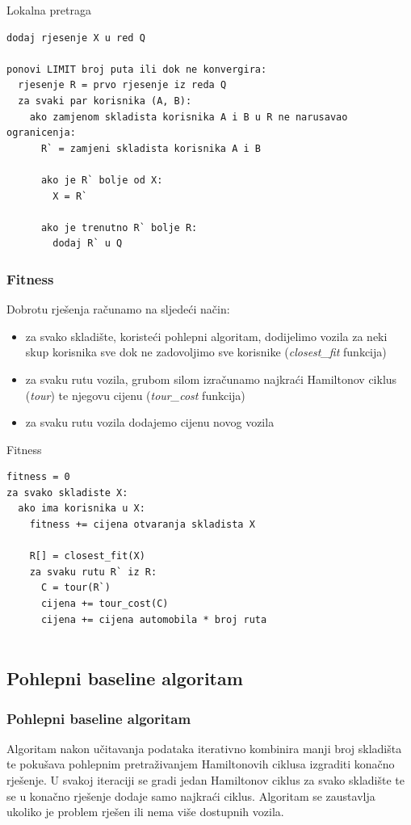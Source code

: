 \documentclass[utf8]{beamer}
\begin{document}
\begin{frame}[fragile]{Lokalna pretraga}
\begin{lstlisting}
dodaj rjesenje X u red Q

ponovi LIMIT broj puta ili dok ne konvergira:
  rjesenje R = prvo rjesenje iz reda Q
  za svaki par korisnika (A, B):
    ako zamjenom skladista korisnika A i B u R ne narusavao ogranicenja:
      R` = zamjeni skladista korisnika A i B
      
      ako je R` bolje od X:
        X = R`
      
      ako je trenutno R` bolje R:
        dodaj R` u Q
\end{lstlisting}
\end{frame}

\begin{frame}
\frametitle{Fitness}
Dobrotu rješenja računamo na sljedeći način:
\begin{itemize}
  \item za svako skladište, koristeći pohlepni algoritam, dodijelimo vozila za neki skup korisnika sve dok ne zadovoljimo sve korisnike (\textit{closest\_fit} funkcija)
  
  \item za svaku rutu vozila, grubom silom izračunamo najkraći Hamiltonov ciklus (\textit{tour}) te njegovu cijenu (\textit{tour\_cost} funkcija)
  
  \item za svaku rutu vozila dodajemo cijenu novog vozila
\end{itemize}
\end{frame}

\begin{frame}[fragile]{Fitness}
\begin{lstlisting}
fitness = 0
za svako skladiste X:
  ako ima korisnika u X:
    fitness += cijena otvaranja skladista X
    
    R[] = closest_fit(X)
    za svaku rutu R` iz R:
      C = tour(R`)
      cijena += tour_cost(C)
      cijena += cijena automobila * broj ruta
      
\end{lstlisting}
\end{frame}

\subsection{Pohlepni baseline algoritam}
\begin{frame}
\frametitle{Pohlepni baseline algoritam}

Algoritam nakon učitavanja podataka iterativno kombinira manji broj skladišta te pokušava pohlepnim pretraživanjem Hamiltonovih ciklusa izgraditi konačno rješenje. U svakoj iteraciji se gradi jedan Hamiltonov ciklus za svako skladište te se u konačno rješenje dodaje samo najkraći ciklus. Algoritam se zaustavlja ukoliko je problem rješen ili nema više dostupnih vozila.

\end{frame}
\end{document}
